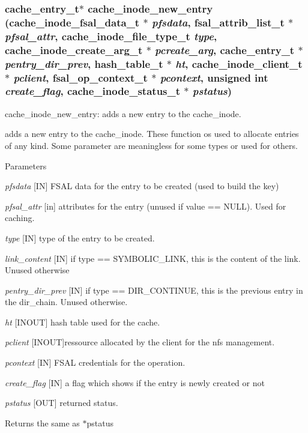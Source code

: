 \subsubsection[{cache\_\-inode\_\-new\_\-entry}]{\setlength{\rightskip}{0pt plus 5cm}cache\_\-entry\_\-t$\ast$ cache\_\-inode\_\-new\_\-entry (cache\_\-inode\_\-fsal\_\-data\_\-t $\ast$ {\em pfsdata}, \/  fsal\_\-attrib\_\-list\_\-t $\ast$ {\em pfsal\_\-attr}, \/  cache\_\-inode\_\-file\_\-type\_\-t {\em type}, \/  cache\_\-inode\_\-create\_\-arg\_\-t $\ast$ {\em pcreate\_\-arg}, \/  cache\_\-entry\_\-t $\ast$ {\em pentry\_\-dir\_\-prev}, \/  hash\_\-table\_\-t $\ast$ {\em ht}, \/  cache\_\-inode\_\-client\_\-t $\ast$ {\em pclient}, \/  fsal\_\-op\_\-context\_\-t $\ast$ {\em pcontext}, \/  unsigned int {\em create\_\-flag}, \/  cache\_\-inode\_\-status\_\-t $\ast$ {\em pstatus})}\label{cache__inode__misc_8c_a8392006e0fb4aea7143cfd950e91a74a}
cache\_\-inode\_\-new\_\-entry: adds a new entry to the cache\_\-inode.

adds a new entry to the cache\_\-inode. These function os used to allocate entries of any kind. Some parameter are meaningless for some types or used for others.


\begin{DoxyParams}{Parameters}
\item[{\em pfsdata}][IN] FSAL data for the entry to be created (used to build the key) \item[{\em pfsal\_\-attr}][in] attributes for the entry (unused if value == NULL). Used for caching. \item[{\em type}][IN] type of the entry to be created. \item[{\em link\_\-content}][IN] if type == SYMBOLIC\_\-LINK, this is the content of the link. Unused otherwise \item[{\em pentry\_\-dir\_\-prev}][IN] if type == DIR\_\-CONTINUE, this is the previous entry in the dir\_\-chain. Unused otherwise. \item[{\em ht}][INOUT] hash table used for the cache. \item[{\em pclient}][INOUT]ressource allocated by the client for the nfs management. \item[{\em pcontext}][IN] FSAL credentials for the operation. \item[{\em create\_\-flag}][IN] a flag which shows if the entry is newly created or not \item[{\em pstatus}][OUT] returned status.\end{DoxyParams}
\begin{DoxyReturn}{Returns}
the same as $\ast$pstatus 
\end{DoxyReturn}


